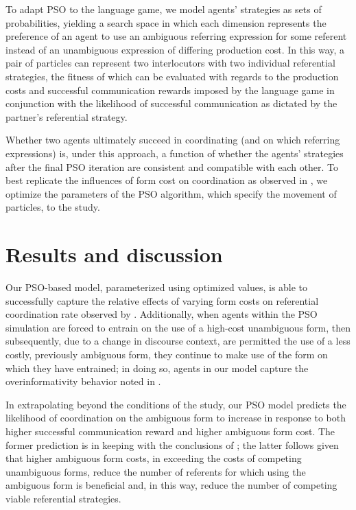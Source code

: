 \documentclass[a4paper,11pt]{article}
\begin{document}
To adapt PSO to the \citeauthor{rohde2012} language game, we model agents' strategies as sets of probabilities, yielding a search space in which each dimension represents the preference of an agent to use an ambiguous referring expression for some referent instead of an unambiguous expression of differing production cost. In this way, a pair of particles can represent two interlocutors with two individual referential strategies, the fitness of which can be evaluated with regards to the production costs and successful communication rewards imposed by the language game in conjunction with the likelihood of successful communication as dictated by the partner's referential strategy. 

Whether two agents ultimately succeed in coordinating (and on which referring expressions) is, under this approach, a function of whether the agents' strategies after the final PSO iteration are consistent and compatible with each other. To best replicate the influences of form cost on coordination as observed in \citeauthor{rohde2012}, we optimize the parameters of the PSO algorithm, which specify the movement of particles, to the study.

\section{Results and discussion}
Our PSO-based model, parameterized using optimized values, is able to successfully capture the relative effects of varying form costs on referential coordination rate observed by \citeauthor{rohde2012}. Additionally, when agents within the PSO simulation are forced to entrain on the use of a high-cost unambiguous form, then subsequently, due to a change in discourse context, are permitted the use of a less costly, previously ambiguous form, they continue to make use of the form on which they have entrained; in doing so, agents in our model capture the overinformativity behavior noted in \citeauthor{brennan1996}.

In extrapolating beyond the conditions of the \citeauthor{rohde2012} study, our PSO model predicts the likelihood of coordination on the ambiguous form to increase in response to both higher successful communication reward and higher ambiguous form cost. The former prediction is in keeping with the conclusions of \citeauthor{rohde2012}; the latter follows given that higher ambiguous form costs, in exceeding the costs of competing unambiguous forms, reduce the number of referents for which using the ambiguous form is beneficial and, in this way, reduce the number of competing viable referential strategies. 
\end{document}
